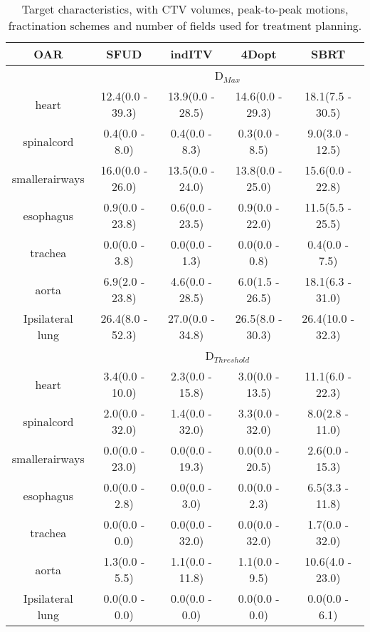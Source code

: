 \begin{table}[H]
	\centering
	\caption{Target characteristics, with CTV volumes, peak-to-peak motions, fractination schemes and number of fields used for treatment planning.}
	\begin{tabular}{c|c|c|c|c}
		\hline\hline
		 
		OAR & SFUD & indITV & 4Dopt & SBRT \\
		\hline
		& \multicolumn{4}{c}{D$_{Max}$} \\
		\hline
heart & 12.4(0.0 - 39.3) & 13.9(0.0 - 28.5) & 14.6(0.0 - 29.3) & 18.1(7.5 - 30.5)\\ 
spinalcord & 0.4(0.0 - 8.0) & 0.4(0.0 - 8.3) & 0.3(0.0 - 8.5) & 9.0(3.0 - 12.5)\\ 
smallerairways & 16.0(0.0 - 26.0) & 13.5(0.0 - 24.0) & 13.8(0.0 - 25.0) & 15.6(0.0 - 22.8)\\ 
esophagus & 0.9(0.0 - 23.8) & 0.6(0.0 - 23.5) & 0.9(0.0 - 22.0) & 11.5(5.5 - 25.5)\\ 
trachea & 0.0(0.0 - 3.8) & 0.0(0.0 - 1.3) & 0.0(0.0 - 0.8) & 0.4(0.0 - 7.5)\\ 
aorta & 6.9(2.0 - 23.8) & 4.6(0.0 - 28.5) & 6.0(1.5 - 26.5) & 18.1(6.3 - 31.0)\\ 
Ipsilateral lung & 26.4(8.0 - 52.3) & 27.0(0.0 - 34.8) & 26.5(8.0 - 30.3) & 26.4(10.0 - 32.3)\\ 

\hline\hline
& \multicolumn{4}{c}{D$_{Threshold}$} \\
\hline

heart & 3.4(0.0 - 10.0) & 2.3(0.0 - 15.8) & 3.0(0.0 - 13.5) & 11.1(6.0 - 22.3)\\ 
spinalcord & 2.0(0.0 - 32.0) & 1.4(0.0 - 32.0) & 3.3(0.0 - 32.0) & 8.0(2.8 - 11.0)\\ 
smallerairways & 0.0(0.0 - 23.0) & 0.0(0.0 - 19.3) & 0.0(0.0 - 20.5) & 2.6(0.0 - 15.3)\\ 
esophagus & 0.0(0.0 - 2.8) & 0.0(0.0 - 3.0) & 0.0(0.0 - 2.3) & 6.5(3.3 - 11.8)\\ 
trachea & 0.0(0.0 - 0.0) & 0.0(0.0 - 32.0) & 0.0(0.0 - 32.0) & 1.7(0.0 - 32.0)\\ 
aorta & 1.3(0.0 - 5.5) & 1.1(0.0 - 11.8) & 1.1(0.0 - 9.5) & 10.6(4.0 - 23.0)\\ 
Ipsilateral lung & 0.0(0.0 - 0.0) & 0.0(0.0 - 0.0) & 0.0(0.0 - 0.0) & 0.0(0.0 - 6.1)\\ 


\hline\hline

	\end{tabular}
	\label{tab:OARComplex}
\end{table}

